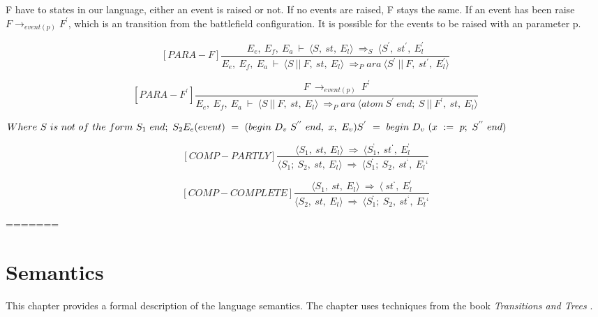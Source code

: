 	
	
	
	
	F have to states in our language, either an event is raised or not. If no events are raised, F stays the same. If an event has been raise \begin{math} F \rightarrow_{event(p)} F^{'} \end{math}, which is an transition from the battlefield configuration. It is possible for the events to be raised with an parameter p. 
	
	
	
	
	
	\[	
	[PARA-F]	
	\dfrac{E_e, \ E_f, \ E_a \ \vdash \ \langle S, \ st, \ E_l \rangle \ \Rightarrow_S \ \langle S^{'}, \ st^{'}, \ E_l^{'}}{E_e, \ E_f, \ E_a \ \vdash \ \langle S \ || \ F, \ st, \ E_l \rangle \ \Rightarrow_Para \ \langle S^{'} \ || \ F, \ st^{'}, \ E_l^{'} \rangle}	
	\]
	
	
	
	
	
	\[	
	[PARA-F^{'}]	
	\dfrac{F \ \rightarrow_{event(p)} \ F^{'}}{E_e, \ E_f, \ E_a \ \vdash \ \langle S \ || \ F, \ st, \ E_l \rangle \ \Rightarrow_Para \ \langle atom \ S^{'} \ end; \ S \ || \ F^{'}, \ st, \ E_l \rangle}	
	\]
	
	
	
	
	
	\begin{math}		
		Where \ S \ is \ not \ of \ the \ form \ S_1 \ end; \ S_2 \newline		
		E_e(event) \ = \ (begin \ D_v \ S^{''} \ end, \ x, \ E_v) \newline		
		S^{'} \ = \ begin \ D_v \ (x \ := \ p; \ S^{''} \ end)		
	\end{math}
	
	
	
	
	
	\[
	[COMP-PARTLY]
	\dfrac{\langle S_1, \ st, \ E_l \rangle \ \Rightarrow \ \langle S_1^{‘}, \ st^{‘}, \ E_l^{‘}}{\langle S_1; \ S_2, \ st, \ E_l \rangle \ \Rightarrow \ \langle S_1^{‘}; \ S_2, \ st^{‘}, \ E_l{‘}}
	\]
	
	\[
	[COMP-COMPLETE]
	\dfrac{\langle S_1, \ st, \ E_l \rangle \ \Rightarrow \ \langle \ st^{‘}, \ E_l^{‘}}{\langle S_2, \ st, \ E_l \rangle \ \Rightarrow \ \langle S_1^{‘}; \ S_2, \ st^{‘}, \ E_l{‘}}
	\]
	
	
=======
\chapter{Semantics}
This chapter provides a formal description of the language semantics. The chapter uses techniques from the book \textit{Transitions and Trees} \citep{Huttel}.
